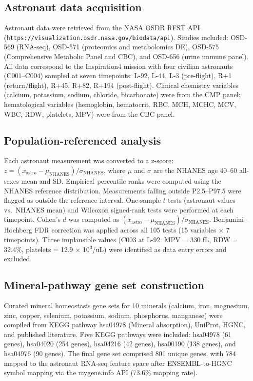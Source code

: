 \documentclass[11pt,a4paper]{article}
\begin{document}
\subsection{Astronaut data acquisition}

Astronaut data were retrieved from the NASA OSDR REST API (\texttt{https://visualization.osdr.nasa.gov/biodata/api}). Studies included: OSD-569 (RNA-seq), OSD-571 (proteomics and metabolomics DE), OSD-575 (Comprehensive Metabolic Panel and CBC), and OSD-656 (urine immune panel). All data correspond to the Inspiration4 mission with four civilian astronauts (C001--C004) sampled at seven timepoints: L-92, L-44, L-3 (pre-flight), R+1 (return/flight), R+45, R+82, R+194 (post-flight). Clinical chemistry variables (calcium, potassium, sodium, chloride, bicarbonate) were from the CMP panel; hematological variables (hemoglobin, hematocrit, RBC, MCH, MCHC, MCV, WBC, RDW, platelets, MPV) were from the CBC panel.

\subsection{Population-referenced analysis}

Each astronaut measurement was converted to a z-score: $z = (x_{\text{astro}} - \mu_{\text{NHANES}}) / \sigma_{\text{NHANES}}$, where $\mu$ and $\sigma$ are the NHANES age 40--60 all-sexes mean and SD. Empirical percentile ranks were computed using the NHANES reference distribution. Measurements falling outside P2.5--P97.5 were flagged as outside the reference interval. One-sample $t$-tests (astronaut values vs.\ NHANES mean) and Wilcoxon signed-rank tests were performed at each timepoint. Cohen's $d$ was computed as $(\bar{x}_{\text{astro}} - \mu_{\text{NHANES}}) / \sigma_{\text{NHANES}}$. Benjamini--Hochberg FDR correction was applied across all 105 tests (15 variables $\times$ 7 timepoints). Three implausible values (C003 at L-92: MPV = 330 fL, RDW = 32.4\%, platelets = 12.9 $\times$ 10$^3$/uL) were identified as data entry errors and excluded.

\subsection{Mineral-pathway gene set construction}

Curated mineral homeostasis gene sets for 10 minerals (calcium, iron, magnesium, zinc, copper, selenium, potassium, sodium, phosphorus, manganese) were compiled from KEGG pathway hsa04978 (Mineral absorption), UniProt, HGNC, and published literature. Five KEGG pathways were included: hsa04978 (61 genes), hsa04020 (254 genes), hsa04216 (42 genes), hsa00190 (138 genes), and hsa04976 (90 genes). The final gene set comprised 801 unique genes, with 784 mapped to the astronaut RNA-seq feature space after ENSEMBL-to-HGNC symbol mapping via the mygene.info API (73.6\% mapping rate).
\end{document}

